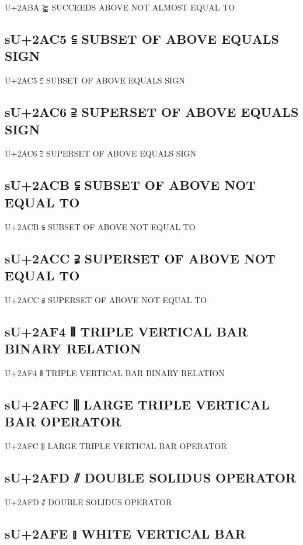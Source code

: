 U+2ABA ⪺ SUCCEEDS ABOVE NOT ALMOST EQUAL TO

\subsection{sU+2AC5 ⫅ SUBSET OF ABOVE EQUALS SIGN}

U+2AC5 ⫅ SUBSET OF ABOVE EQUALS SIGN

\subsection{sU+2AC6 ⫆ SUPERSET OF ABOVE EQUALS SIGN}

U+2AC6 ⫆ SUPERSET OF ABOVE EQUALS SIGN

\subsection{sU+2ACB ⫋ SUBSET OF ABOVE NOT EQUAL TO}

U+2ACB ⫋ SUBSET OF ABOVE NOT EQUAL TO

\subsection{sU+2ACC ⫌ SUPERSET OF ABOVE NOT EQUAL TO}

U+2ACC ⫌ SUPERSET OF ABOVE NOT EQUAL TO

\subsection{sU+2AF4 ⫴ TRIPLE VERTICAL BAR BINARY RELATION}

U+2AF4 ⫴ TRIPLE VERTICAL BAR BINARY RELATION

\subsection{sU+2AFC ⫼ LARGE TRIPLE VERTICAL BAR OPERATOR}

U+2AFC ⫼ LARGE TRIPLE VERTICAL BAR OPERATOR

\subsection{sU+2AFD ⫽ DOUBLE SOLIDUS OPERATOR}

U+2AFD ⫽ DOUBLE SOLIDUS OPERATOR

\subsection{sU+2AFE ⫾ WHITE VERTICAL BAR}

